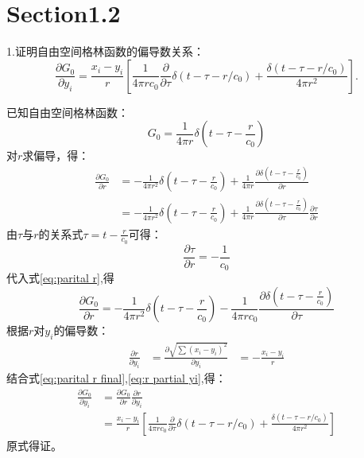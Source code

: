 \section*{Section1.2}

\noindent 1.证明自由空间格林函数的偏导数关系：
$$\frac{\partial G_{0}}{\partial y_{i}}=
\frac{x_{i}-y_{i}}{r}\left[\frac{1}{4 \pi r c_{0}} \frac{\partial}{\partial \tau} \delta\left(t-\tau-r / c_{0}\right)+
\frac{\delta\left(t-\tau-r / c_{0}\right)}{4 \pi r^{2}}\right].$$

\noindent 已知自由空间格林函数：
\begin{equation}
    G_{0}=\frac{1}{4 \pi r} \delta\left(t-\tau-\frac{r}{c_{0}}\right)     
\end{equation}
对$r$求偏导，得：
\begin{equation}
    \begin{aligned}
        \label{eq:parital r}
        \frac{\partial G_{0}}{\partial r} &= -\frac{1}{4 \pi r^{2}} \delta\left(t-\tau-\frac{r}{c_{0}}\right)+\frac{1}{4 \pi r} \frac{\partial \delta\left(t-\tau -\frac{r}{c_{0}}\right)}{\partial r} \\
        &= -\frac{1}{4 \pi r^{2}} \delta\left(t-\tau-\frac{r}{c_{0}}\right)+\frac{1}{4 \pi r} \frac{\partial \delta\left(t-\tau -\frac{r}{c_{0}}\right)}{\partial \tau} \frac{\partial \tau}{\partial r}   
    \end{aligned}
\end{equation}
由$ \tau $与$ r $的关系式$ \tau = t - \frac{r}{c_{0}} $可得：
\begin{equation}
    \frac{\partial \tau}{\partial r} = - \frac{1}{c_{0}}
\end{equation} 
代入式\eqref{eq:parital r},得
\begin{equation}
    \label{eq:parital r final}
    \frac{\partial G_{0}}{\partial r} = -\frac{1}{4 \pi r^{2}} \delta\left(t-\tau-\frac{r}{c_{0}}\right)-\frac{1}{4 \pi r c_{0}} \frac{\partial \delta\left(t-\tau -\frac{r}{c_{0}}\right)}{\partial \tau}
\end{equation}
根据$r$对$y_{i}$的偏导数：
\begin{equation}
    \label{eq:r partial yi}
    \begin{aligned}
        \frac{\partial r}{\partial y_{i}} &=  \frac{\partial \sqrt{\sum (x_{i} - y_{i})^2}}{\partial y_{i}}
        &= - \frac{x_{i} - y_{i}}{r}
    \end{aligned}
\end{equation}
结合式\eqref{eq:parital r final},\eqref{eq:r partial yi},得：
\begin{equation}
    \label{eq:G0 partial yi}
    \begin{aligned}
        \frac{\partial G_{0}}{\partial y_{i}} &= \frac{\partial G_{0}}{\partial r} \frac{\partial r}{\partial y_{i}} \\
        &= \frac{x_{i}-y_{i}}{r}\left[\frac{1}{4 \pi r c_{0}} \frac{\partial}{\partial \tau} \delta\left(t-\tau-r / c_{0}\right)+
            \frac{\delta\left(t-\tau-r / c_{0}\right)}{4 \pi r^{2}}\right]
    \end{aligned}
\end{equation}
原式得证。


